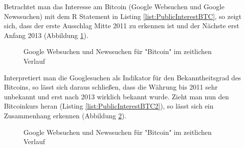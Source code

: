 Betrachtet man das Interesse am Bitcoin (Google Websuchen und Google Newssuchen) mit dem R Statement in Listing \ref{list:PublicInterestBTC}, so zeigt sich, dass der erste Ausschlag Mitte 2011 zu erkennen ist und der Nächste erst Anfang 2013 (Abbildung \ref{fig:PublicInterestBTC}). 

\begin{figure}[H]
\centering
{}
\caption{Google Websuchen und Newssuchen für "Bitcoin" im zeitlichen Verlauf}
\label{fig:PublicInterestBTC}
\end{figure}
Interpretiert man die Googlesuchen als Indikator für den Bekanntheitsgrad des Bitcoins, so lässt sich daraus schließen, dass die Währung bis 2011 sehr unbekannt und erst nach 2013 wirklich bekannt wurde. Zieht man nun den Bitcoinkurs heran (Listing \ref{list:PublicInterestBTC2}), so lässt sich ein Zusammenhang erkennen (Abbildung \ref{fig:PublicInterestBTC2}). 

\begin{figure}[H]
\centering
{}
\caption{Google Websuchen und Newssuchen für "Bitcoin" im zeitlichen Verlauf}
\label{fig:PublicInterestBTC2}
\end{figure}
